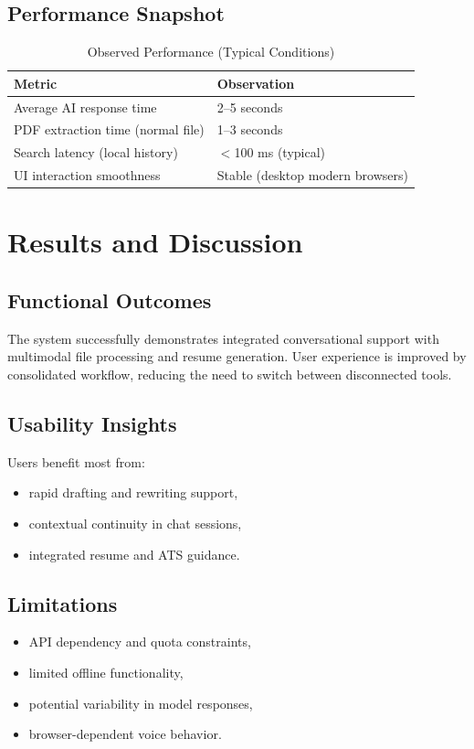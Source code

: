 \documentclass[12pt,a4paper]{report}
\begin{document}
\section{Performance Snapshot}
\begin{table}[H]
\centering
\caption{Observed Performance (Typical Conditions)}
\begin{tabular}{|p{2.4in}|p{2.3in}|}
\hline
\textbf{Metric} & \textbf{Observation} \\
\hline
Average AI response time & 2--5 seconds \\
\hline
PDF extraction time (normal file) & 1--3 seconds \\
\hline
Search latency (local history) & $<$100 ms (typical) \\
\hline
UI interaction smoothness & Stable (desktop modern browsers) \\
\hline
\end{tabular}
\end{table}

\chapter{Results and Discussion}
\section{Functional Outcomes}
The system successfully demonstrates integrated conversational support with multimodal file processing and resume generation. User experience is improved by consolidated workflow, reducing the need to switch between disconnected tools.

\section{Usability Insights}
Users benefit most from:
\begin{itemize}
  \item rapid drafting and rewriting support,
  \item contextual continuity in chat sessions,
  \item integrated resume and ATS guidance.
\end{itemize}

\section{Limitations}
\begin{itemize}
  \item API dependency and quota constraints,
  \item limited offline functionality,
  \item potential variability in model responses,
  \item browser-dependent voice behavior.
\end{itemize}
\end{document}
